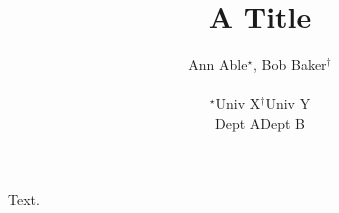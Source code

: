 \documentclass{article}
\title{A Title}
\author{Ann Able$^\star$, Bob Baker$^\dagger$\\
\begin{tabular}{cc}
$^\star$Univ X & $^\dagger$Univ Y\\
Dept A & Dept B
\end{tabular}}
\begin{document}
\maketitle
Text.
\end{document}
